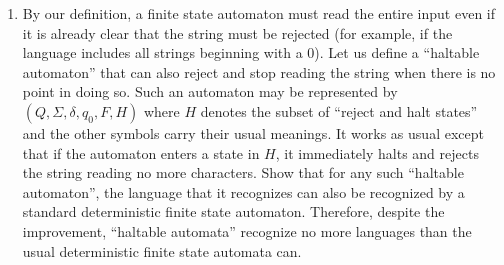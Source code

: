 \documentclass[a4paper]{article}
\begin{document}
\begin{enumerate}
           \item By our definition, a finite state automaton must read the entire input even if it is already clear that the string must be rejected (for example, if the language includes all strings beginning with a 0). Let us define a “haltable automaton” that can also reject and stop reading the string when there is no point in doing so. Such an automaton may be represented by $(Q,\Sigma,\delta,q_0,F,H)$ where $H$ denotes the subset of “reject and halt states” and the other symbols carry their usual meanings. It works as usual except that if the automaton enters a state in $H$, it immediately halts and rejects the string reading no more characters. Show that for any such “haltable automaton”, the language that it recognizes can also be recognized by a standard deterministic finite state automaton. Therefore, despite the improvement, “haltable automata” recognize no more languages than the usual deterministic finite state automata can.
\end{enumerate}
\end{document}
